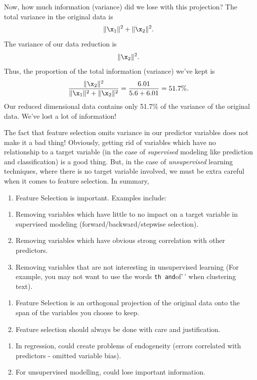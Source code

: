 \documentclass[
]{article}
\providecommand{\tightlist}{%
  \setlength{\itemsep}{0pt}\setlength{\parskip}{0pt}}
\theoremstyle{definition}
\theoremstyle{definition}
\theoremstyle{definition}
\theoremstyle{definition}
\theoremstyle{remark}
\begin{document}
Now, how much information (variance) did we lose with this projection? The total variance in the original data is
\[\|\x_1\|^2+\|\x_2\|^2.\]
The variance of our data reduction is
\[\|\x_2\|^2.\]
Thus, the proportion of the total information (variance) we've kept is
\[\frac{\|\x_2\|^2}{\|\x_1\|^2+\|\x_2\|^2}=\frac{6.01}{5.6+6.01} = 51.7\%.\]
Our reduced dimensional data contains only 51.7\% of the variance of the original data. We've lost a lot of information!

The fact that feature selection omits variance in our predictor variables does not make it a bad thing! Obviously, getting rid of variables which have no relationship to a target variable (in the case of \emph{supervised} modeling like prediction and classification) is a good thing. But, in the case of \emph{unsupervised} learning techniques, where there is no target variable involved, we must be extra careful when it comes to feature selection. In summary,

\begin{enumerate}
\def\labelenumi{\arabic{enumi}.}
\tightlist
\item
  Feature Selection is important. Examples include:
\end{enumerate}

\begin{enumerate}
\def\labelenumi{\alph{enumi}.}
\tightlist
\item
  Removing variables which have little to no impact on a target variable in supervised modeling (forward/backward/stepwise selection).
\item
  Removing variables which have obvious strong correlation with other predictors.
\item
  Removing variables that are not interesting in unsupervised learning (For example, you may not want to use the words \texttt{th\textquotesingle{}\textquotesingle{}\ and}of'\,' when clustering text).
\end{enumerate}

\begin{enumerate}
\def\labelenumi{\arabic{enumi}.}
\setcounter{enumi}{1}
\tightlist
\item
  Feature Selection is an orthogonal projection of the original data onto the span of the variables you choose to keep.
\item
  Feature selection should always be done with care and justification.
\end{enumerate}

\begin{enumerate}
\def\labelenumi{\alph{enumi}.}
\setcounter{enumi}{3}
\tightlist
\item
  In regression, could create problems of endogeneity (errors correlated with predictors - omitted variable bias).
\item
  For unsupervised modelling, could lose important information.
\end{enumerate}
\end{document}

